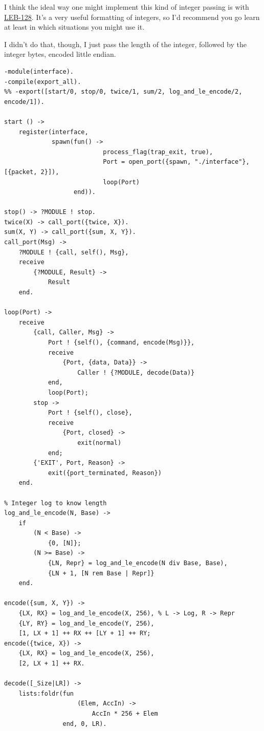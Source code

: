\documentclass[11pt]{article}
\begin{document}
I think the ideal way one might implement this kind of integer
passing is with \href{https://en.wikipedia.org/wiki/LEB128?oldformat=true}{LEB-128}. It's a very useful formatting of integers,
so I'd recommend you go learn at least in which situations you
might use it.

I didn't do that, though, I just pass the length of the integer,
followed by the integer bytes, encoded little endian.

\begin{verbatim}
-module(interface).
-compile(export_all).
%% -export([start/0, stop/0, twice/1, sum/2, log_and_le_encode/2, encode/1]).

start () ->
    register(interface,
             spawn(fun() ->
                           process_flag(trap_exit, true),
                           Port = open_port({spawn, "./interface"}, [{packet, 2}]),
                           loop(Port)
                   end)).

stop() -> ?MODULE ! stop.
twice(X) -> call_port({twice, X}).
sum(X, Y) -> call_port({sum, X, Y}).
call_port(Msg) ->
    ?MODULE ! {call, self(), Msg},
    receive
        {?MODULE, Result} ->
            Result
    end.

loop(Port) ->
    receive
        {call, Caller, Msg} ->
            Port ! {self(), {command, encode(Msg)}},
            receive
                {Port, {data, Data}} ->
                    Caller ! {?MODULE, decode(Data)}
            end,
            loop(Port);
        stop ->
            Port ! {self(), close},
            receive
                {Port, closed} ->
                    exit(normal)
            end;
        {'EXIT', Port, Reason} ->
            exit({port_terminated, Reason})
    end.

% Integer log to know length
log_and_le_encode(N, Base) ->
    if 
        (N < Base) ->
            {0, [N]};
        (N >= Base) ->
            {LN, Repr} = log_and_le_encode(N div Base, Base),
            {LN + 1, [N rem Base | Repr]}
    end.

encode({sum, X, Y}) -> 
    {LX, RX} = log_and_le_encode(X, 256), % L -> Log, R -> Repr
    {LY, RY} = log_and_le_encode(Y, 256),
    [1, LX + 1] ++ RX ++ [LY + 1] ++ RY;
encode({twice, X}) -> 
    {LX, RX} = log_and_le_encode(X, 256),
    [2, LX + 1] ++ RX.

decode([_Size|LR]) -> 
    lists:foldr(fun 
                    (Elem, AccIn) -> 
                        AccIn * 256 + Elem 
                end, 0, LR). 
\end{verbatim}
\end{document}
